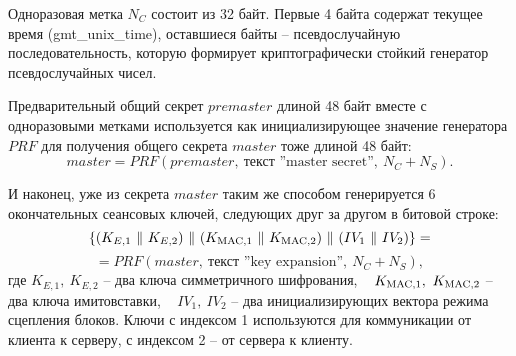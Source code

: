 





Одноразовая метка $N_C$ состоит из 32 байт. Первые 4 байта содержат текущее время (gmt_unix_time), оставшиеся байты -- псевдослучайную последовательность, которую формирует криптографически стойкий генератор псевдослучайных чисел.

Предварительный общий секрет $premaster$ длиной 48 байт вместе с одноразовыми метками используется как инициализирующее значение генератора $PRF$ для получения общего секрета $master$ тоже длиной 48 байт:
    \[ master = PRF(premaster, ~\text{текст ''master secret''}, ~ N_C + N_S) .\]

И наконец, уже из секрета $master$ таким же способом генерируется 6 окончательных сеансовых ключей, следующих друг за другом в битовой строке:
    \[ \{ (K_{E,1} ~\|~ K_{E,2}) ~\|~ (K_{\textrm{MAC},1} ~\|~ K_{\textrm{MAC},2}) ~\|~ (IV_1 ~\|~ IV_2) \} = \]
        \[ = PRF(master, ~\text{текст ''key expansion''}, ~ N_C + N_S), \]
где $K_{E,1}, ~ K_{E,2}$ -- два ключа симметричного шифрования, ~ $K_{\textrm{MAC},1}, ~ K_{\textrm{MAC},2}$ -- два ключа имитовставки, ~ $IV_1, ~IV_2$ -- два инициализирующих вектора режима сцепления блоков. Ключи с индексом 1 используются для коммуникации от клиента к серверу, с индексом 2 -- от сервера к клиенту.


